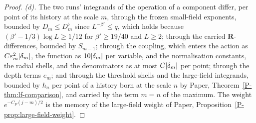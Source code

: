 \documentclass[11pt]{preprint}
\DeclarePairedDelimiter{\abs}{\lvert}{\rvert}
\numberwithin{equation}{section}
\theoremstyle{definition}
\theoremstyle{remark}
\theoremstyle{plain}
\begin{document}
\begin{proof}
\emph{(d).} The two runs' integrands of the operation of a component differ, per point of its history at the scale $m$, through the frozen small-field exponents, bounded by $D_m \leq D^\flat_m$ since $L^{-\beta'} \leq q$, which holds because $(\beta' - 1/3)\log L \geq 1/12$ for $\beta' \geq 19/40$ and $L \geq 2$; through the carried $\mathbf R$-differences, bounded by $S_{m-1}$; through the coupling, which enters the action as $C\varepsilon_m^2\abs{\delta_m}$, the function \cite[(1.6), p.~178]{BalabanLFR1} as $10\abs{\delta_m}$ per variable, and the normalisation constants, the radial shells, and the denominators as at most $C\abs{\delta_m}$ per point; through the depth terms $e_m$; and through the threshold shells and the large-field integrands, bounded by $h_n$ per point of a history born at the scale $n$ by Paper, Theorem~\ref{P-thm:lf-comparison}, and carried by the term $m = n$ of the maximum. The weight $e^{-C_P(j-m)/2}$ is the memory of the large-field weight of Paper, Proposition~\ref{P-prop:large-field-weight}.


\end{proof}
\end{document}
